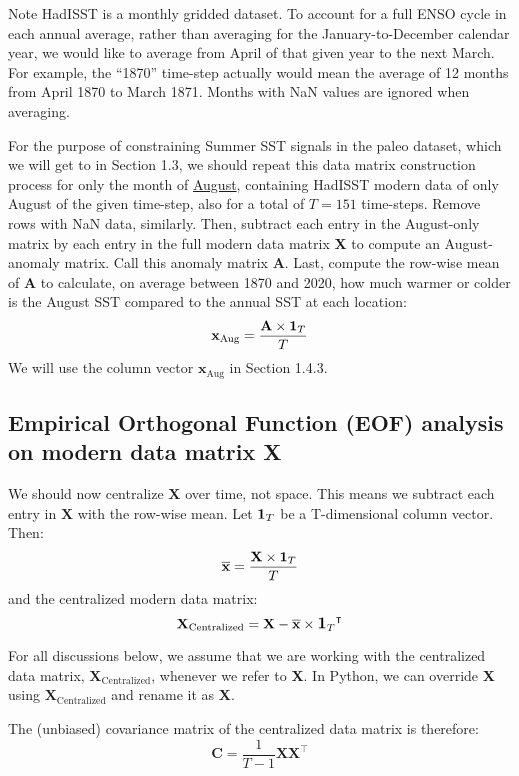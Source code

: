 \documentclass{article}
\begin{document}
Note HadISST is a monthly gridded dataset. To account for a full ENSO cycle in each annual average, rather than averaging for the January-to-December calendar year, we would like to average from April of that given year to the next March. For example, the “1870” time-step actually would mean the average of 12 months from April 1870 to March 1871. Months with NaN values are ignored when averaging.

For the purpose of constraining Summer SST signals in the paleo dataset, which we will get to in Section 1.3, we should repeat this data matrix construction process for only the month of \ul{August}, containing HadISST modern data of only August of the given time-step, also for a total of $T=151$ time-steps. Remove rows with NaN data, similarly. Then, subtract each entry in the August-only matrix by each entry in the full modern data matrix \textbf{X} to compute an August-anomaly matrix. Call this anomaly matrix \textbf{A}. Last, compute the row-wise mean of \textbf{A} to calculate, on average between 1870 and 2020, how much warmer or colder is the August SST compared to the annual SST at each location:
$$\textbf{x}_{\text{Aug}} = \frac{\textbf{A} \times \mathlarger{\mathbf{1}}_{T}}{T}$$
We will use the column vector $\textbf{x}_{\text{Aug}}$ in Section 1.4.3.

\subsection{Empirical Orthogonal Function (EOF) analysis on modern data matrix \textbf{X}}

We should now centralize $\textbf{X}$ over time, not space. This means we subtract each entry in $\textbf{X}$ with the row-wise mean. Let $\mathlarger{\mathbf{1}}_{T}$ be a T-dimensional column vector. Then:
$$\overline{\textbf{x}} = \frac{\textbf{X} \times \mathlarger{\mathbf{1}}_{T}}{T}$$
and the centralized modern data matrix:
$$\textbf{X}_{\text{Centralized}} = \textbf{X} - \overline{\textbf{x}} \times {\mathlarger{\mathbf{1}}_{T}}^\intercal$$

For all discussions below, we assume that we are working with the centralized data matrix, $\textbf{X}_{\text{Centralized}}$, whenever we refer to \textbf{X}. In Python, we can override \textbf{X} using $\textbf{X}_{\text{Centralized}}$ and rename it as \textbf{X}.

The (unbiased) covariance matrix of the centralized data matrix is therefore:
$$\textbf{C} = \frac{1}{T-1} \textbf{X} \textbf{X}^\intercal$$
\end{document}
